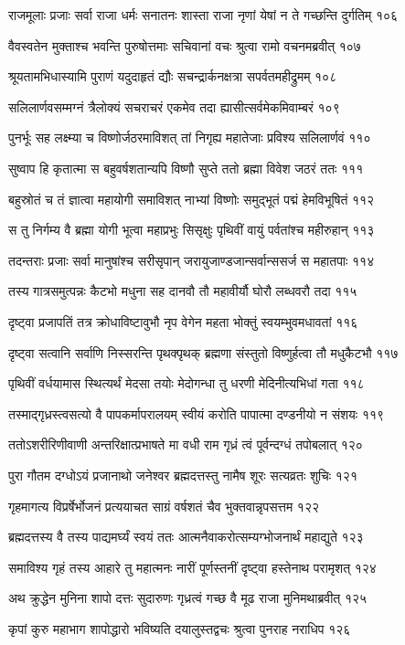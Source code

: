 राजमूलाः प्रजाः सर्वा राजा धर्मः सनातनः
शास्ता राजा नृणां येषां न ते गच्छन्ति दुर्गतिम् १०६

वैवस्वतेन मुक्ताश्च भवन्ति पुरुषोत्तमाः
सचिवानां वचः श्रुत्वा रामो वचनमब्रवीत् १०७

श्रूयतामभिधास्यामि पुराणं यदुदाहृतं
द्यौः सचन्द्रार्कनक्षत्रा सपर्वतमहीद्रुमम् १०८

सलिलार्णवसम्मग्नं त्रैलोक्यं सचराचरं
एकमेव तदा ह्यासीत्सर्वमेकमिवाम्बरं १०९

पुनर्भूः सह लक्ष्म्या च विष्णोर्जठरमाविशत्
तां निगृह्य महातेजाः प्रविश्य सलिलार्णवं ११०

सुष्वाप हि कृतात्मा स बहुवर्षशतान्यपि
विष्णौ सुप्ते ततो ब्रह्मा विवेश जठरं ततः १११

बहुस्रोतं च तं ज्ञात्वा महायोगी समाविशत्
नाभ्यां विष्णोः समुद्भूतं पद्मं हेमविभूषितं ११२

स तु निर्गम्य वै ब्रह्मा योगी भूत्वा महाप्रभुः
सिसृक्षुः पृथिवीं वायुं पर्वतांश्च महीरुहान् ११३

तदन्तराः प्रजाः सर्वा मानुषांश्च सरीसृपान्
जरायुजाण्डजान्सर्वान्ससर्ज स महातपाः ११४

तस्य गात्रसमुत्पन्नः कैटभो मधुना सह
दानवौ तौ महावीर्यौ घोरौ लब्धवरौ तदा ११५

दृष्ट्वा प्रजापतिं तत्र क्रोधाविष्टावुभौ नृप
वेगेन महता भोक्तुं स्वयम्भुवमधावतां ११६

दृष्ट्वा सत्वानि सर्वाणि निस्सरन्ति पृथक्पृथक्
ब्रह्मणा संस्तुतो विष्णुर्हत्वा तौ मधुकैटभौ ११७

पृथिवीं वर्धयामास स्थित्यर्थं मेदसा तयोः
मेदोगन्धा तु धरणी मेदिनीत्यभिधां गता ११८

तस्माद्गृध्रस्त्वसत्यो वै पापकर्मापरालयम्
स्वीयं करोति पापात्मा दण्डनीयो न संशयः ११९

ततोऽशरीरिणीवाणी अन्तरिक्षात्प्रभाषते
मा वधी राम गृध्रं त्वं पूर्वन्दग्धं तपोबलात् १२०

पुरा गौतम दग्धोऽयं प्रजानाथो जनेश्वर
ब्रह्मदत्तस्तु नामैष शूरः सत्यव्रतः शुचिः १२१

गृहमागत्य विप्रर्षेर्भोजनं प्रत्ययाचत
साग्रं वर्षशतं चैव भुक्तवान्नृपसत्तम १२२

ब्रह्मदत्तस्य वै तस्य पाद्यमर्घ्यं स्वयं ततः
आत्मनैवाकरोत्सम्यग्भोजनार्थं महाद्युते १२३

समाविश्य गृहं तस्य आहारे तु महात्मनः
नारीं पूर्णस्तनीं दृष्ट्वा हस्तेनाथ परामृशत् १२४

अथ क्रुद्धेन मुनिना शापो दत्तः सुदारुणः
गृध्रत्वं गच्छ वै मूढ राजा मुनिमथाब्रवीत् १२५

कृपां कुरु महाभाग शापोद्धारो भविष्यति
दयालुस्तद्वचः श्रुत्वा पुनराह नराधिप १२६

